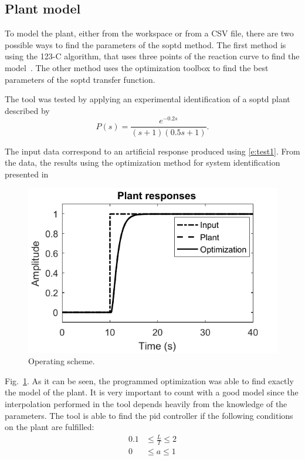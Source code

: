 %
\subsection{Plant model}
To model the plant, either from the workspace or from a CSV file, there are two possible ways to find the parameters of the \gls{soptd} method. The first method is using the 123-C algorithm, that uses three points of the reaction curve to find the model~\parencite{Alfaro2006}. The other method uses the optimization toolbox to find the best parameters of the \gls{soptd} transfer function.

The tool was tested by applying an experimental identification of a \gls{soptd} plant described by
\begin{equation}
P(s)=\frac{e^{-0.2s}}{(s+1)(0.5s+1)}.
\label{e:test1}
\end{equation}

The input data correspond to an artificial response produced using \eqref{e:test1}. From the data, the results using the optimization method for system identification presented in %
%
\begin{figure}%
	\begin{center}
		\includegraphics[width=0.65\columnwidth]{figuras/identification}
		\caption{Operating scheme.}
		\label{f:test_res_1}
	\end{center}
\end{figure}
%
%
Fig.~\ref{f:test_res_1}. As it can be seen, the programmed optimization was able to find exactly the model of the plant. It is very important to count with a good model since the interpolation performed in the tool depends heavily from the knowledge of the parameters. The tool is able to find the \gls{pid} controller if the following conditions on the plant are fulfilled:
\begin{equation}
\begin{split}
0.1 &\leq \frac{L}{T} \leq 2 \\
0 &\leq a \leq 1
\end{split}
\label{eq:limits}
\end{equation}
%
